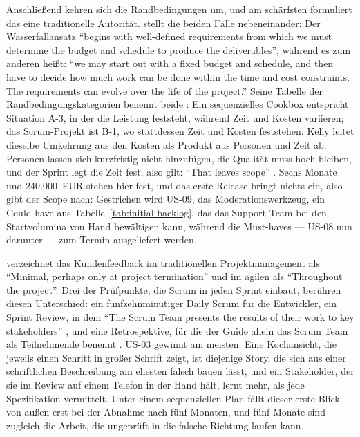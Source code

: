 Anschließend kehren sich die Randbedingungen um, und am schärfsten formuliert das
eine traditionelle Autorität. \textcite[p.~78]{kerzner2022} stellt die beiden
Fälle nebeneinander: Der Wasserfallansatz \enquote{begins with well-defined requirements from
which we must determine the budget and schedule to produce the deliverables},
während es zum anderen heißt: \enquote{we may start out with a fixed budget and schedule,
and then have to decide how much work can be done within the time and cost
constraints. The requirements can evolve over the life of the project.} Seine
Tabelle der Randbedingungskategorien benennt beide \parencite[p.~609]{kerzner2022}: Ein
sequenzielles Cookbox entspricht Situation A-3, in der die Leistung feststeht,
während Zeit und Kosten variieren; das Scrum-Projekt ist B-1, wo stattdessen
Zeit und Kosten feststehen. Kelly leitet dieselbe Umkehrung aus den Kosten als
Produkt aus Personen und Zeit ab: Personen lassen sich kurzfristig nicht
hinzufügen, die Qualität muss hoch bleiben, und der Sprint legt die Zeit fest,
also gilt: \enquote{That leaves scope} \parencite[ch.~1, pp.~5--10]{kelly2019}. Sechs Monate
und 240.000~EUR stehen hier fest, und das erste Release bringt nichts ein, also
gibt der Scope nach: Gestrichen wird US-09, das Moderationswerkzeug, ein
Could-have aus Tabelle~\ref{tab:initial-backlog}, das das Support-Team bei den
Startvolumina von Hand bewältigen kann, während die Must-haves --- US-08 nun
darunter --- zum Termin ausgeliefert werden.

\textcite[p.~307]{kerzner2022} verzeichnet das Kundenfeedback im traditionellen
Projektmanagement als \enquote{Minimal, perhaps only at project termination} und im
agilen als \enquote{Throughout the project}. Drei der Prüfpunkte, die Scrum in
jeden Sprint einbaut, berühren diesen Unterschied: ein fünfzehnminütiger Daily
Scrum für die Entwickler, ein Sprint
Review, in dem \enquote{The Scrum Team presents the results of their work to
key stakeholders} \parencite[p.~9]{scrumguide2020}, und eine Retrospektive, für
die der Guide allein das Scrum Team als Teilnehmende benennt
\parencite[p.~10]{scrumguide2020}. US-03 gewinnt am meisten: Eine Kochansicht,
die jeweils einen Schritt in großer Schrift zeigt, ist diejenige Story, die sich
aus einer schriftlichen Beschreibung am ehesten falsch bauen lässt, und ein
Stakeholder, der sie im Review auf einem Telefon in der Hand hält, lernt mehr,
als jede Spezifikation vermittelt. Unter einem sequenziellen Plan fällt dieser
erste Blick von außen erst bei der Abnahme nach fünf Monaten, und fünf Monate
sind zugleich die Arbeit, die ungeprüft in die falsche Richtung laufen kann.

